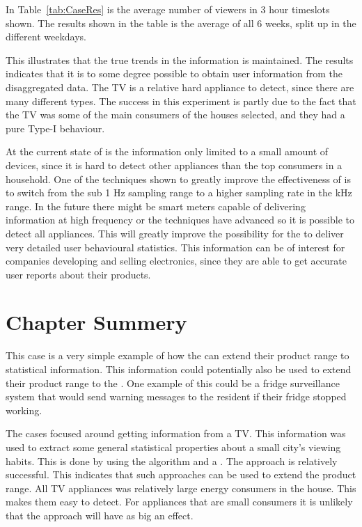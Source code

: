 In Table~\ref{tab:CaseRes} is the average number of viewers in 3 hour timeslots shown. The results shown in the table is the average of all 6 weeks, split up in the different weekdays. 



This illustrates that the true trends in the information is maintained. The results indicates that it is to some degree possible to obtain user information from the disaggregated data. The TV is a relative hard appliance to detect, since there are many different types. The success in this experiment is partly due to the fact that the TV was some of the main consumers of the houses selected, and they had a pure Type-I behaviour.

At the current state of  is the information only limited to a small amount of devices, since it is hard to detect other appliances than the top consumers in a household. One of the techniques shown to greatly improve the effectiveness of  is to switch from the sub 1 Hz sampling range to a higher sampling rate in the kHz range. In the future there might be smart meters capable of delivering information at high frequency or the  techniques have advanced so it is possible to detect all appliances. This will greatly improve the possibility for the  to deliver very detailed user behavioural statistics. This information can be of interest for companies developing and selling electronics, since they are able to get accurate user reports about their products. 

\section{Chapter Summery}
This case is a very simple example of how the  can extend their product range to statistical information. This information could potentially also be used to extend their product range to the . One example of this could be a fridge surveillance system that would send warning messages to the resident if their fridge stopped working.

The cases focused around getting information from a TV. This information was used to extract some general statistical properties about a small city's viewing habits. This is done by using the  algorithm and a . The approach is relatively successful. This indicates that such approaches can be used to extend the  product range. All TV appliances was relatively large energy consumers in the house. This makes them easy to detect. For appliances that are small consumers it is unlikely that the approach will have as big an effect.